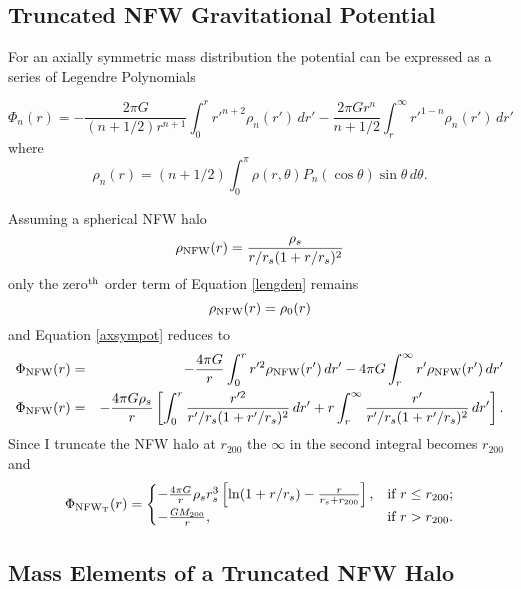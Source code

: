 \documentclass[12pt]{emulateapj}
\begin{document}
\subsection{Truncated NFW Gravitational Potential}\label{nfwpotential}

For an axially symmetric mass distribution the potential can be expressed as a series of Legendre Polynomials

\begin{equation}
\Phi_n(r) = -\frac{2\pi G}{(n+1/2)r^{n+1}} \int_{0}^{r} r'^{n+2} \rho_{n}(r')\,dr' -\frac{2\pi G r^n}{n+1/2} \int_{r}^{\infty} r'^{1-n} \rho_n(r')\,dr' 
\label{axsympot}
\end{equation}
where
\begin{equation}
\rho_n(r) = (n+1/2) \int_{0}^{\pi} \rho(r,\theta) P_n(\cos \theta) \sin \theta \,d\theta.
\label{lengden}
\end{equation}

Assuming a spherical NFW halo
\begin{displaymath}
\rho_{\rm NFW}(r) = \frac{\rho_s}{r/r_s(1+r/r_s)^2}
\end{displaymath}
only the zero$^{\rm th}$ order term of Equation \ref{lengden} remains
\begin{displaymath}
\rho_{\rm NFW}(r) = \rho_0(r)
\end{displaymath}
and Equation \ref{axsympot} reduces to
\begin{eqnarray}
\Phi_{\rm NFW}(r) & = & -\frac{4\pi G}{r}\int_{0}^{r} r'^2 \rho_{\rm NFW}(r')\,dr' - 4\pi G \int_{r}^{\infty}r' \rho_{\rm NFW}(r')\,dr' \nonumber\\
\Phi_{\rm NFW}(r) & = & -\frac{4\pi G \rho_s}{r} \left[ \int_{0}^{r} \frac{r'^2}{r'/r_s(1+r'/r_s)^2}\,dr' + r \int_{r}^{\infty} \frac{r'}{r'/r_s(1+r'/r_s)^2}\,dr' \right]. \nonumber
\end{eqnarray}
Since I truncate the NFW halo at $r_{200}$ the $\infty$ in the second integral becomes $r_{200}$ and
\begin{equation}
	\Phi_{\rm NFW_T}(r)=
	\begin{cases}
 		-\frac{4\pi G}{r} \rho_s r_s^3 \left[ \ln (1+r/r_s)-\frac{r}{r_s+r_{200}} \right], &\text{if $r\leq r_{200}$;}\\
  		-\frac{G M_{200}}{r}, &\text{if $r>r_{200}$.}
  	\end{cases}
\end{equation}

\subsection{Mass Elements of a Truncated NFW Halo}\label{masselements}
\end{document}
